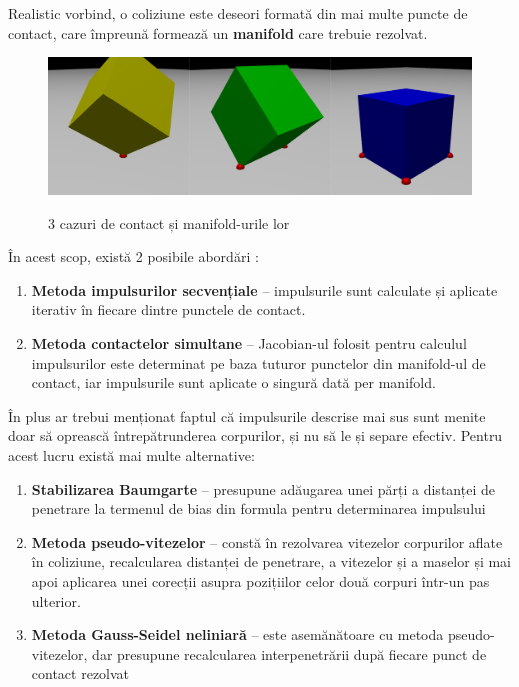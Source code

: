 \documentclass[12pt,a4paper]{report}
\begin{document}
Realistic vorbind, o coliziune este deseori formată din mai multe puncte de contact, care împreună formează un \textbf{manifold} care trebuie rezolvat.
\begin{figure}[H]
	\centering
	\includegraphics[width=0.7\linewidth]{pics/cap3_03.png}
	\label{fig:cap3_03}
	\caption[]{3 cazuri de contact și manifold-urile lor}
\end{figure}
În acest scop, există 2 posibile abordări \cite{eberly_collision_response}:
\begin{enumerate}
	\item \textbf{Metoda impulsurilor secvențiale}\label{seq_impulse_method} -- impulsurile sunt calculate și aplicate iterativ în fiecare dintre punctele de contact.
	\item \textbf{Metoda contactelor simultane} -- Jacobian-ul folosit pentru calculul impulsurilor este determinat pe baza tuturor punctelor din manifold-ul de contact, iar impulsurile sunt aplicate o singură dată per manifold.
\end{enumerate}

În plus ar trebui menționat faptul că impulsurile descrise mai sus sunt menite doar să oprească întrepătrunderea corpurilor, și nu să le și separe efectiv. Pentru acest lucru există mai multe alternative\cite{catto_position_correction}:
\begin{enumerate}
	\item \textbf{Stabilizarea Baumgarte} -- presupune adăugarea unei părți a distanței de penetrare la termenul de bias din formula pentru determinarea impulsului
	\item \textbf{Metoda pseudo-vitezelor}\label{pseudo_velocities} -- constă în rezolvarea vitezelor corpurilor aflate în coliziune, recalcularea distanței de penetrare, a vitezelor și a maselor și mai apoi aplicarea unei corecții asupra pozițiilor celor două corpuri într-un pas ulterior.
	\item \textbf{Metoda Gauss-Seidel neliniară} -- este asemănătoare cu metoda pseudo-vitezelor, dar presupune recalcularea interpenetrării după fiecare punct de contact rezolvat
\end{enumerate}
\end{document}
